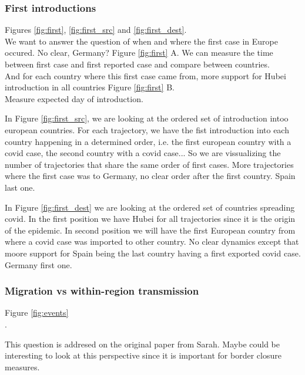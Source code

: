 \documentclass[12pt,]{article}
\begin{document}
\subsubsection*{First introductions}
Figures \ref{fig:first}, \ref{fig:first_src} and \ref{fig:first_dest}.\\

We want to answer the question of when and where the first case in Europe occured. No clear, Germany? Figure \ref{fig:first} A. We can measure the time between first case and first reported case and compare between countries. \\
And for each country where this first case came from, more support for Hubei introduction in all countries Figure \ref{fig:first} B.\\

Measure expected day of introduction.

In Figure \ref{fig:first_src}, we are looking at the ordered set of introduction intoo european countries. For each trajectory, we have the fist introduction into each country happening in a determined order, i.e. the first european country with a covid case, the second country with a covid case... So we are vissualizing the number of trajectories that share the same order of first cases. More trajectories where the first case was to Germany, no clear order after the first country. Spain last one.\\

In Figure \ref{fig:first_dest} we are looking at the ordered set of countries spreading covid. In the first position we have Hubei for all trajectories since it is the origin of the epidemic. In second position we will have the first European country from where a covid case was imported to other country. No clear dynamics except that moore support for Spain being the last country having a first exported covid case. Germany first one.\\  

\subsubsection*{Migration vs within-region transmission}

Figure \ref{fig:events}\\.

This question is addresed on the original paper from Sarah.  Maybe could be interesting to look at this perspective since it is important for border closure measures.
\end{document}
